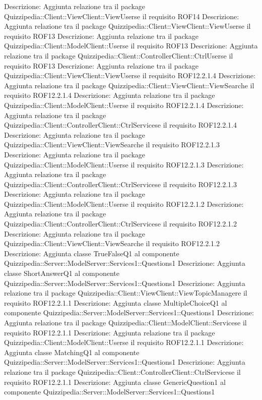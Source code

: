 Descrizione: Aggiunta relazione tra il package Quizzipedia::Client::ViewClient::ViewUserse il requisito ROF14 
Descrizione: Aggiunta relazione tra il package Quizzipedia::Client::ViewClient::ViewUserse il requisito ROF13 
Descrizione: Aggiunta relazione tra il package Quizzipedia::Client::ModelClient::Userse il requisito ROF13 
Descrizione: Aggiunta relazione tra il package Quizzipedia::Client::ControllerClient::CtrlUserse il requisito ROF13 
Descrizione: Aggiunta relazione tra il package Quizzipedia::Client::ViewClient::ViewUserse il requisito ROF12.2.1.4 
Descrizione: Aggiunta relazione tra il package Quizzipedia::Client::ViewClient::ViewSearche il requisito ROF12.2.1.4 
Descrizione: Aggiunta relazione tra il package Quizzipedia::Client::ModelClient::Userse il requisito ROF12.2.1.4 
Descrizione: Aggiunta relazione tra il package Quizzipedia::Client::ControllerClient::CtrlServicese il requisito ROF12.2.1.4 
Descrizione: Aggiunta relazione tra il package Quizzipedia::Client::ViewClient::ViewSearche il requisito ROF12.2.1.3 
Descrizione: Aggiunta relazione tra il package Quizzipedia::Client::ModelClient::Userse il requisito ROF12.2.1.3 
Descrizione: Aggiunta relazione tra il package Quizzipedia::Client::ControllerClient::CtrlServicese il requisito ROF12.2.1.3 
Descrizione: Aggiunta relazione tra il package Quizzipedia::Client::ModelClient::Userse il requisito ROF12.2.1.2 
Descrizione: Aggiunta relazione tra il package Quizzipedia::Client::ControllerClient::CtrlServicese il requisito ROF12.2.1.2 
Descrizione: Aggiunta relazione tra il package Quizzipedia::Client::ViewClient::ViewSearche il requisito ROF12.2.1.2 
Descrizione: Aggiunta classe TrueFalseQ1 al componente Quizzipedia::Server::ModelServer::Services1::Questions1 
Descrizione: Aggiunta classe ShortAnswerQ1 al componente Quizzipedia::Server::ModelServer::Services1::Questions1 
Descrizione: Aggiunta relazione tra il package Quizzipedia::Client::ViewClient::ViewTopicManagere il requisito ROF12.2.1.1 
Descrizione: Aggiunta classe MultipleChoiceQ1 al componente Quizzipedia::Server::ModelServer::Services1::Questions1 
Descrizione: Aggiunta relazione tra il package Quizzipedia::Client::ModelClient::Servicese il requisito ROF12.2.1.1 
Descrizione: Aggiunta relazione tra il package Quizzipedia::Client::ModelClient::Userse il requisito ROF12.2.1.1 
Descrizione: Aggiunta classe MatchingQ1 al componente Quizzipedia::Server::ModelServer::Services1::Questions1 
Descrizione: Aggiunta relazione tra il package Quizzipedia::Client::ControllerClient::CtrlServicese il requisito ROF12.2.1.1 
Descrizione: Aggiunta classe GenericQuestion1 al componente Quizzipedia::Server::ModelServer::Services1::Questions1 
